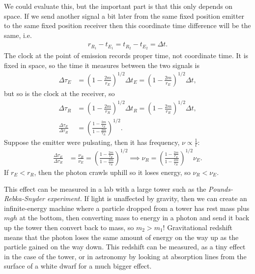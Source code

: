 \documentclass[a4paper, 11pt, normalem]{report}
\begin{document}
We could evaluate this, but the important part is that this only depends on space. 
If we send another signal a bit later from the same fixed position emitter to the same fixed position receiver then this coordinate time difference will be the same, i.e.
\begin{align}
    r_{R_1}-t_{E_1} = t_{R_2}-t_{E_2} = \Delta t.
\end{align}
The clock at the point of emission records proper time, not coordinate time. 
It is fixed in space, so the time it measures between the two signals is
\begin{align}
    \Delta\tau_E &= \left(1-\frac{2m}{r_E}\right)^{1/2}\Delta t_E = \left(1-\frac{2m}{r_E}\right)^{1/2}\Delta t,
\end{align}
but so is the clock at the receiver, so
\begin{align}
    \Delta\tau_R &= \left(1-\frac{2m}{r_R}\right)^{1/2}\Delta t_R = \left(1-\frac{2m}{r_R}\right)^{1/2}\Delta t, \\
    \frac{\Delta\tau_E}{\Delta\tau_R} &=\left(\frac{1-\frac{2m}{r_E}}{1-\frac{2m}{r_R}}\right)^{1/2}.
\end{align}
Suppose the emitter were pulsating, then it has frequency, $\nu\propto\frac{1}{t}$:
\begin{align}
    \frac{\Delta\tau_E}{\Delta\tau_R} &= \frac{\nu_R}{\nu_E} = \left(\frac{1-\frac{2m}{r_E}}{1-\frac{2m}{r_R}}\right)^{1/2} \implies \nu_R = \left(\frac{1-\frac{2m}{r_E}}{1-\frac{2m}{r_R}}\right)^{1/2}\nu_E.
\end{align}
If $r_E<r_R$, then the photon crawls uphill so it loses energy, so $\nu_R<\nu_E$.

This effect can be measured in a lab with a large tower such as the \emph{Pounds-Rebka-Snyder experiment.}
If light is unaffected by gravity, then we can create an infinite-energy machine where a particle dropped from a tower has rest mass plus $mgh$ at the bottom, then converting mass to energy in a photon and send it back up the tower then convert back to mass, so $m_2>m_1$!
Gravitational redshift means that the photon loses the same amount of energy on the way up as the particle gained on the way down. 
This redshift can be measured, as a tiny effect in the case of the tower, or in astronomy by looking at absorption lines from the surface of a white dwarf for a much bigger effect.
\end{document}
